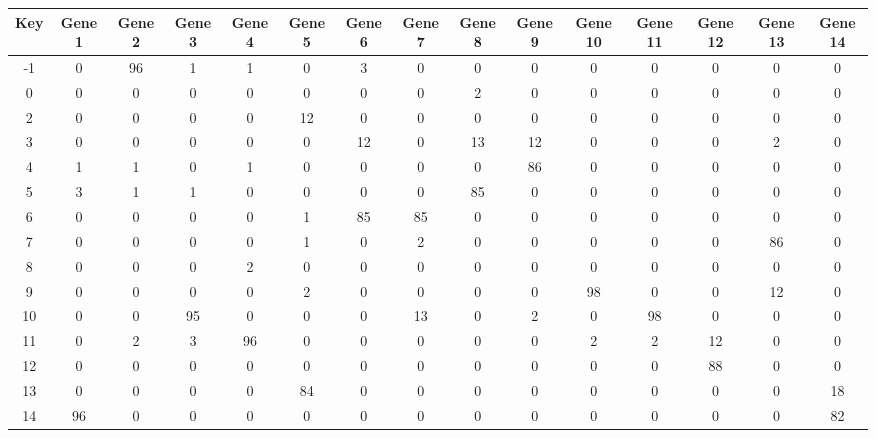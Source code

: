\begin{tabular}{|c|c|c|c|c|c|c|c|c|c|c|c|c|c|c|}
\hline
Key & Gene 1 & Gene 2 & Gene 3 & Gene 4 & Gene 5 & Gene 6 & Gene 7 & Gene 8 & Gene 9 & Gene 10 & Gene 11 & Gene 12 & Gene 13 & Gene 14 \\
\hline
-1 & 0 & 96 & 1 & 1 & 0 & 3 & 0 & 0 & 0 & 0 & 0 & 0 & 0 & 0 \\
0 & 0 & 0 & 0 & 0 & 0 & 0 & 0 & 2 & 0 & 0 & 0 & 0 & 0 & 0 \\
2 & 0 & 0 & 0 & 0 & 12 & 0 & 0 & 0 & 0 & 0 & 0 & 0 & 0 & 0 \\
3 & 0 & 0 & 0 & 0 & 0 & 12 & 0 & 13 & 12 & 0 & 0 & 0 & 2 & 0 \\
4 & 1 & 1 & 0 & 1 & 0 & 0 & 0 & 0 & 86 & 0 & 0 & 0 & 0 & 0 \\
5 & 3 & 1 & 1 & 0 & 0 & 0 & 0 & 85 & 0 & 0 & 0 & 0 & 0 & 0 \\
6 & 0 & 0 & 0 & 0 & 1 & 85 & 85 & 0 & 0 & 0 & 0 & 0 & 0 & 0 \\
7 & 0 & 0 & 0 & 0 & 1 & 0 & 2 & 0 & 0 & 0 & 0 & 0 & 86 & 0 \\
8 & 0 & 0 & 0 & 2 & 0 & 0 & 0 & 0 & 0 & 0 & 0 & 0 & 0 & 0 \\
9 & 0 & 0 & 0 & 0 & 2 & 0 & 0 & 0 & 0 & 98 & 0 & 0 & 12 & 0 \\
10 & 0 & 0 & 95 & 0 & 0 & 0 & 13 & 0 & 2 & 0 & 98 & 0 & 0 & 0 \\
11 & 0 & 2 & 3 & 96 & 0 & 0 & 0 & 0 & 0 & 2 & 2 & 12 & 0 & 0 \\
12 & 0 & 0 & 0 & 0 & 0 & 0 & 0 & 0 & 0 & 0 & 0 & 88 & 0 & 0 \\
13 & 0 & 0 & 0 & 0 & 84 & 0 & 0 & 0 & 0 & 0 & 0 & 0 & 0 & 18 \\
14 & 96 & 0 & 0 & 0 & 0 & 0 & 0 & 0 & 0 & 0 & 0 & 0 & 0 & 82 \\
\hline
\end{tabular}